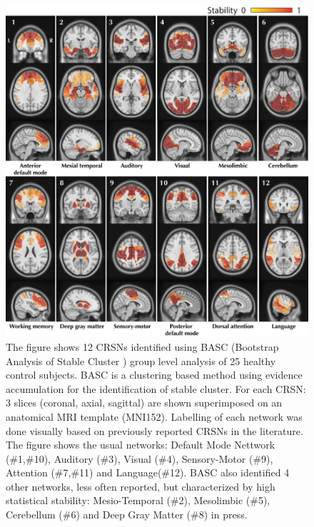 \begin{figure}[H]
\begin{center}
\includegraphics[scale=0.40]{../figures/CRSN.png}
\end{center}
\caption[Consistent resting-state network (CRSN)]
{The figure shows 12 CRSNs identified using BASC (Bootstrap Analysis of Stable Cluster \citep{Bellec2010c}) group level
analysis of 25 healthy control subjects. BASC is a clustering based method using evidence accumulation for the identification of stable cluster. For each CRSN: 3 slices (coronal, axial, sagittal)
are shown superimposed on an anatomical MRI template (MNI152). Labelling of each network was done visually based on previously reported CRSNs in the literature. The figure shows the usual networks: Default Mode Nettwork (\#1,\#10), Auditory (\#3), Visual (\#4), Sensory-Motor (\#9), Attention (\#7,\#11) and Language(\#12). BASC also identified 4 other networks, less often reported, but characterized by high statistical stability: Mesio-Temporal (\#2), Mesolimbic (\#5), Cerebellum (\#6) and Deep Gray Matter (\#8) \citep{Dansereau2014b} in press.}
\label{fig_crsn}
\end{figure}

